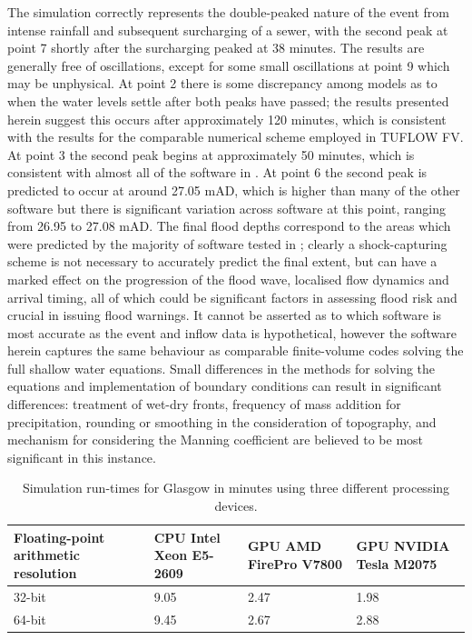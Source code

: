 \documentclass[11pt,english,a4paper]{article}
\begin{document}
The simulation correctly represents the double-peaked nature of the event from intense rainfall and subsequent surcharging of a sewer, with the second peak at point 7 shortly after the surcharging peaked at 38 minutes. The results are generally free of oscillations, except for some small oscillations at point 9 which may be unphysical. At point 2 there is some discrepancy among models as to when the water levels settle after both peaks have passed; the results presented herein suggest this occurs after approximately 120 minutes, which is consistent with the results for the comparable numerical scheme employed in TUFLOW FV. At point 3 the second peak begins at approximately 50 minutes, which is consistent with almost all of the software in \citet{Pender2013}. At point 6 the second peak is predicted to occur at around 27.05 mAD, which is higher than many of the other software but there is significant variation across software at this point, ranging from 26.95 to 27.08 mAD. The final flood depths correspond to the areas which were predicted by the majority of software tested in \citet{Pender2013}; clearly a shock-capturing scheme is not necessary to accurately predict the final extent, but can have a marked effect on the progression of the flood wave, localised flow dynamics and arrival timing, all of which could be significant factors in assessing flood risk and crucial in issuing flood warnings. It cannot be asserted as to which software is most accurate as the event and inflow data is hypothetical, however the software herein captures the same behaviour as comparable finite-volume codes solving the full shallow water equations. Small differences in the methods for solving the equations and implementation of boundary conditions can result in significant differences: treatment of wet-dry fronts, frequency of mass addition for precipitation, rounding or smoothing in the consideration of topography, and mechanism for considering the Manning coefficient are believed to be most significant in this instance.

\begin{table}[pb]
\small
\centering
\caption{Simulation run-times for Glasgow in minutes using three different processing devices.}
\label{GlasgowPerformance}
\begin{tabular}{p{}p{}p{}p{}}
\hline
\raggedright{Floating-point arithmetic resolution}	& \raggedright{CPU Intel Xeon E5-2609} & \raggedright{GPU AMD FirePro V7800} 		& GPU NVIDIA Tesla M2075 \\
\hline
32-bit 							& 9.05					& 2.47					& 1.98				\\
64-bit 							& 9.45					& 2.67					& 2.88				\\
\hline
\end{tabular}
\end{table}
\end{document}
